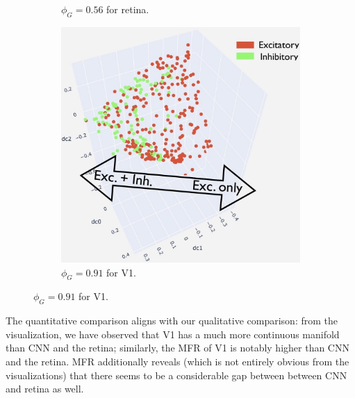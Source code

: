 \begin{figure}[H]
\begin{subfigure}[b]{0.3\textwidth}
        \caption{$\phi_G = 0.56$ for retina.}
\end{subfigure}
\hfill
\begin{subfigure}[b]{0.3\textwidth}
        \includegraphics[width=\textwidth]{figures/biological/v1-manifold.jpg}
        \caption{$\phi_G = 0.91$ for V1.}
\end{subfigure}
\end{figure} 
The quantitative comparison aligns with our qualitative comparison: from the visualization, we have observed that V1 has a much more continuous manifold than CNN and the retina; similarly, the MFR of V1 is notably higher than CNN and the retina. MFR additionally reveals (which is not entirely obvious from the visualizations) that there seems to be a considerable gap between between CNN and retina as well.

